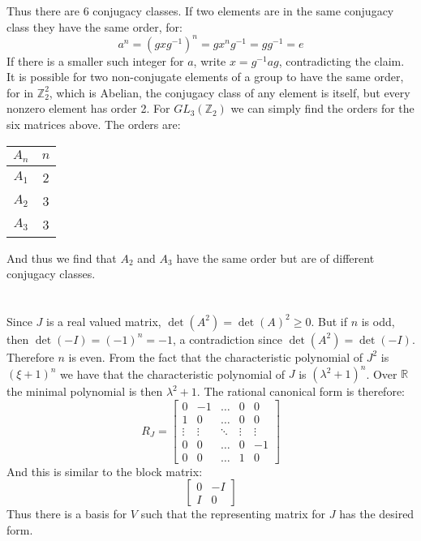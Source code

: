 \documentclass[crop=false,class=article]{standalone}                           %
\begin{document}
        Thus there are 6 conjugacy classes. If two elements are in the same
        conjugacy class they have the same order, for:
        \begin{equation}
            a^{n}=(gxg^{\minus{1}})^{n}
            =gx^{n}g^{\minus{1}}
            =gg^{\minus{1}}
            =e
        \end{equation}
        If there is a smaller such integer for $a$, write $x=g^{\minus{1}}ag$,
        contradicting the claim. It is possible for two non-conjugate elements
        of a group to have the same order, for in $\mathbb{Z}_{2}^{2}$, which is
        Abelian, the conjugacy class of any element is itself, but every
        nonzero element has order 2. For $GL_{3}(\mathbb{Z}_{2})$ we can simply
        find the orders for the six matrices above.
        The orders are:
        \begin{table}
            \centering
            \begin{tabular}{c|c}
                $A_{n}$&$n$\\
                \hline
                $A_{1}$&2\\
                $A_{2}$&3\\
                $A_{3}$&3
            \end{tabular}
        \end{table}
        And thus we find that $A_{2}$ and $A_{3}$ have the same order but are of
        different conjugacy classes.
    \section{}
        Since $J$ is a real valued matrix, $\det(A^{2})=\det(A)^{2}\geq{0}$.
        But if $n$ is odd, then $\det(\minus{I})=(\minus{1})^{n}=\minus{1}$,
        a contradiction since $\det(A^{2})=\det(\minus{I})$. Therefore $n$ is
        even. From the fact that the characteristic polynomial of $J^{2}$ is
        $(\xi+1)^{n}$ we have that the characteristic polynomial of $J$ is
        $(\lambda^{2}+1)^{n}$. Over $\mathbb{R}$ the minimal polynomial is then
        $\lambda^{2}+1$. The rational canonical form is therefore:
        \begin{equation}
            R_{J}=
            \begin{bmatrix}
                0&\minus{1}&\dots&0&0\\
                1&0&\dots&0&0\\
                \vdots&\vdots&\ddots&\vdots&\vdots\\
                0&0&\dots&0&\minus{1}\\
                0&0&\dots&1&0
            \end{bmatrix}
        \end{equation}
        And this is similar to the block matrix:
        \begin{equation}
            \begin{bmatrix}
                0&\minus{I}\\
                I&0
            \end{bmatrix}
        \end{equation}
        Thus there is a basis for $V$ such that the representing matrix for $J$
        has the desired form.
\end{document}
